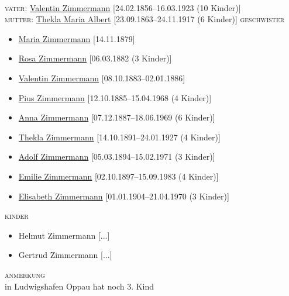 \begin{person}[
    surname = {Zimmermann},
    givenname = {Karl},
    suffix = {},
    label = {@I969@}
    ]

\begin{tabular}{cl}
\end{tabular}\\
\medbreak
\textsc{vater}: \hyperref[@I392@]{Valentin Zimmermann} [24.02.1856--16.03.1923 (10 Kinder)]\\
\textsc{mutter}: \hyperref[@I391@]{Thekla Maria Albert} [23.09.1863--24.11.1917 (6 Kinder)]
\medbreak
\textsc{{geschwister}}
\begin{itemize}
\item \hyperref[@I975@]{Maria Zimmermann} [14.11.1879]
\item \hyperref[@I974@]{Rosa Zimmermann} [06.03.1882 (3 Kinder)]
\item \hyperref[@I1358@]{Valentin Zimmermann} [08.10.1883--02.01.1886]
\item \hyperref[@I973@]{Pius Zimmermann} [12.10.1885--15.04.1968 (4 Kinder)]
\item \hyperref[@I14@]{Anna Zimmermann} [07.12.1887--18.06.1969 (6 Kinder)]
\item \hyperref[@I360@]{Thekla Zimmermann} [14.10.1891--24.01.1927 (4 Kinder)]
\item \hyperref[@I968@]{Adolf Zimmermann} [05.03.1894--15.02.1971 (3 Kinder)]
\item \hyperref[@I967@]{Emilie Zimmermann} [02.10.1897--15.09.1983 (4 Kinder)]
\item \hyperref[@I966@]{Elisabeth Zimmermann} [01.01.1904--21.04.1970 (3 Kinder)]
\end{itemize}
\bigbreak
\textsc{{kinder}}
\begin{itemize}
\item Helmut Zimmermann [...]
\item Gertrud Zimmermann [...]
\end{itemize}
\medbreak
\textsc{anmerkung}\\
in Ludwigshafen Oppau
hat noch 3. Kind
\medbreak
\end{person}




